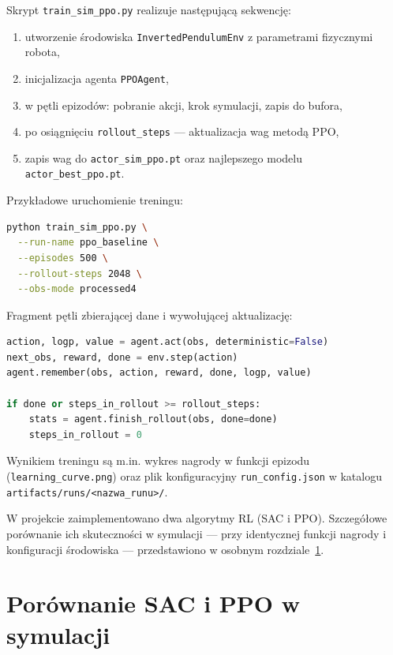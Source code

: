 \documentclass[12pt,twoside]{article}
\begin{document}
Skrypt \texttt{train\_sim\_ppo.py} realizuje następującą sekwencję:
\begin{enumerate}
    \item utworzenie środowiska \texttt{InvertedPendulumEnv} z parametrami fizycznymi robota,
    \item inicjalizacja agenta \texttt{PPOAgent},
    \item w pętli epizodów: pobranie akcji, krok symulacji, zapis do bufora,
    \item po osiągnięciu \texttt{rollout\_steps} --- aktualizacja wag metodą PPO,
    \item zapis wag do \texttt{actor\_sim\_ppo.pt} oraz najlepszego modelu \texttt{actor\_best\_ppo.pt}.
\end{enumerate}

Przykładowe uruchomienie treningu:

\begin{lstlisting}[language=bash, caption=Uruchomienie treningu PPO w symulacji, label=listPPO3]
python train_sim_ppo.py \
  --run-name ppo_baseline \
  --episodes 500 \
  --rollout-steps 2048 \
  --obs-mode processed4
\end{lstlisting}

Fragment pętli zbierającej dane i wywołującej aktualizację:

\begin{lstlisting}[language=Python, caption=Pętla treningowa PPO, label=listPPO4]
action, logp, value = agent.act(obs, deterministic=False)
next_obs, reward, done = env.step(action)
agent.remember(obs, action, reward, done, logp, value)

if done or steps_in_rollout >= rollout_steps:
    stats = agent.finish_rollout(obs, done=done)
    steps_in_rollout = 0
\end{lstlisting}

Wynikiem treningu są m.in. wykres nagrody w funkcji epizodu (\texttt{learning\_curve.png}) oraz plik konfiguracyjny \texttt{run\_config.json} w katalogu \texttt{artifacts/runs/<nazwa\_runu>/}.

W projekcie zaimplementowano dwa algorytmy RL (SAC i PPO). Szczegółowe porównanie ich skuteczności w symulacji --- przy identycznej funkcji nagrody i konfiguracji środowiska --- przedstawiono w osobnym rozdziale~\ref{sec:sac_ppo_cmp}.

\section{Porównanie SAC i PPO w symulacji}
\label{sec:sac_ppo_cmp}
\end{document}

